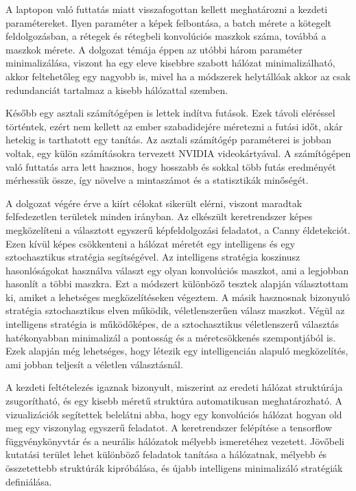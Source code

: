 \documentclass[12pt]{report}
\begin{document}
A laptopon való futtatás miatt visszafogottan kellett meghatározni a kezdeti paramétereket. Ilyen paraméter a képek felbontása, a batch mérete a kötegelt feldolgozásban, a rétegek és rétegbeli konvolúciós maszkok száma, továbbá a maszkok mérete. A dolgozat témája éppen az utóbbi három paraméter minimalizálása, viszont ha egy eleve kisebbre szabott hálózat minimalizálható, akkor feltehetőleg egy nagyobb is, mivel ha a módszerek helytállóak akkor az csak redundanciát tartalmaz a kisebb hálózattal szemben.

Később egy asztali számítógépen is lettek indítva futások. Ezek távoli eléréssel történtek, ezért nem kellett az ember szabadidejére méretezni a futási időt, akár hetekig is tarthatott egy tanítás. Az asztali számítógép paraméterei is jobban voltak, egy külön számításokra tervezett NVIDIA videokártyával. A számítógépen való futtatás arra lett hasznos, hogy hosszabb és sokkal több futás eredményét mérhessük össze, így növelve a mintaszámot és a statisztikák minőségét.

A dolgozat végére érve a kiírt célokat sikerült elérni, viszont maradtak felfedezetlen területek minden irányban. Az elkészült keretrendszer képes megközelíteni a választott egyszerű képfeldolgozási feladatot, a Canny éldetekciót. Ezen kívül képes csökkenteni a hálózat méretét egy intelligens és egy sztochasztikus stratégia segítségével. Az intelligens stratégia koszinusz hasonlóságokat használva választ egy olyan konvolúciós maszkot, ami a legjobban hasonlít a többi maszkra. Ezt a módszert különböző tesztek alapján választottam ki, amiket a lehetséges megközelítéseken végeztem. A másik hasznosnak bizonyuló stratégia sztochasztikus elven működik, véletlenszerűen válasz maszkot. Végül az intelligens stratégia is működőképes, de a sztochasztikus véletlenszerű választás hatékonyabban minimalizál a pontosság és a méretcsökkenés szempontjából is. Ezek alapján még lehetséges, hogy létezik egy intelligencián alapuló megközelítés, ami jobban teljesít a véletlen választásnál.

A kezdeti feltételezés igaznak bizonyult, miszerint az eredeti hálózat struktúrája zsugorítható, és egy kisebb méretű struktúra automatikusan meghatározható. A vizualizációk segítettek belelátni abba, hogy egy konvolúciós hálózat hogyan old meg egy viszonylag egyszerű feladatot. A keretrendszer felépítése a tensorflow függvénykönyvtár és a neurális hálózatok mélyebb ismeretéhez vezetett. Jövőbeli kutatási terület lehet különböző feladatok tanítása a hálózatnak, mélyebb és összetettebb struktúrák kipróbálása, és újabb intelligens minimalizáló stratégiák definiálása.
\end{document}
